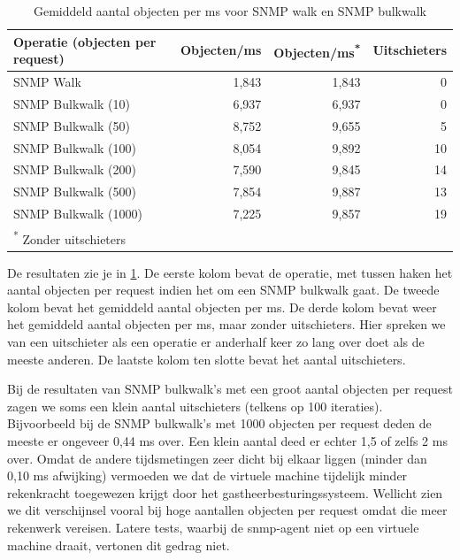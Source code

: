 \begin{table}[h]
\centering
\begin{tabular}{@{}lrrr@{}}
\toprule
Operatie (objecten per request) & Objecten/ms & Objecten/ms\textsuperscript{*} & Uitschieters \\ \midrule
SNMP Walk                       & 1,843       & 1,843           & 0            \\
SNMP Bulkwalk (10)              & 6,937       & 6,937           & 0            \\
SNMP Bulkwalk (50)              & 8,752       & 9,655           & 5            \\
SNMP Bulkwalk (100)             & 8,054       & 9,892           & 10           \\
SNMP Bulkwalk (200)             & 7,590       & 9,845           & 14           \\
SNMP Bulkwalk (500)             & 7,854       & 9,887           & 13           \\
SNMP Bulkwalk (1000)            & 7,225       & 9,857           & 19           \\ \midrule[.5pt]
\multicolumn{4}{l}{\textsuperscript{*} \footnotesize{Zonder uitschieters}}
\end{tabular}
\caption{Gemiddeld aantal objecten per ms voor SNMP walk en SNMP bulkwalk}
\label{tabel-bulkrequests}
\end{table}


De resultaten zie je in \cref{tabel-bulkrequests}.
De eerste kolom bevat de operatie, met tussen haken het aantal objecten per request indien het om een SNMP bulkwalk gaat.
De tweede kolom bevat het gemiddeld aantal objecten per ms.
De derde kolom bevat weer het gemiddeld aantal objecten per ms, maar zonder uitschieters.
Hier spreken we van een uitschieter als een operatie er anderhalf keer zo lang over doet als de meeste anderen.
De laatste kolom ten slotte bevat het aantal uitschieters.

Bij de resultaten van SNMP bulkwalk's met een groot aantal objecten per request zagen we soms een klein aantal uitschieters (telkens op 100 iteraties).
Bijvoorbeeld bij de SNMP bulkwalk's met 1000 objecten per request deden de meeste er ongeveer 0,44 ms over.
Een klein aantal deed er echter 1,5 of zelfs 2 ms over.
Omdat de andere tijdsmetingen zeer dicht bij elkaar liggen (minder dan 0,10 ms afwijking) vermoeden we
dat de virtuele machine tijdelijk minder rekenkracht toegewezen krijgt door het gastheerbesturingssysteem.
Wellicht zien we dit verschijnsel vooral bij hoge aantallen objecten per request omdat die meer rekenwerk vereisen.
Latere tests, waarbij de \gls{snmp-agent} niet op een virtuele machine draait, vertonen dit gedrag niet.

